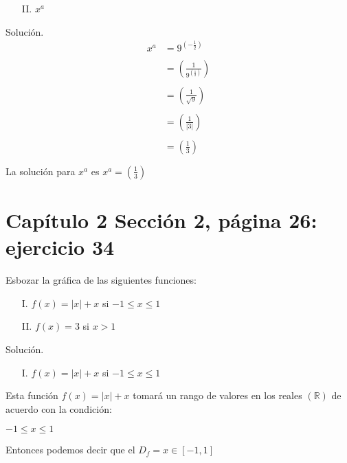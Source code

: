 \documentclass[12pt]{article}
\begin{document}
\begin{enumerate}
    \item [II.] $x^a$ 
\end{enumerate}
{\red Solución.} 
\begin{equation}
    \begin{split}
        x^a & = 9^{(-\frac{1}{2})}\\\\
         & = (\frac{1}{9^{(\frac{1}{2})}})\\\\
        & = (\frac{1}{\sqrt{9}})\\\\
         & = (\frac{1}{|3|})\\\\
          & = (\frac{1}{3})\\\\
    \end{split}
\end{equation}
La solución para $x^a$ es \textbf{$x^a = (\frac{1}{3}) $} \\

\newpage

\section{Capítulo 2 Sección 2, página 26: ejercicio 34}

\sffamily
Esbozar la gráfica de las siguientes funciones:

\begin{enumerate}
      \item [I.] $f(x) = |x| + x$ si $-1\leq x\leq1$
    \item [II.] $f(x) = 3$ si $x>1$
\end{enumerate}

{\red Solución.} 

\begin{enumerate}
    \item [I.] $f(x) = |x| + x$ si $-1\leq x\leq1$
\end{enumerate}

Esta función $f(x) = |x| + x$ tomará un rango de valores en los reales $(\mathbb{R})$ de acuerdo con la condición: \\

\begin{center}
    $-1\leq x\leq1$
\end{center}

Entonces podemos decir que el $D_f = x \in \left[-1,1\right]$\\
\end{document}
